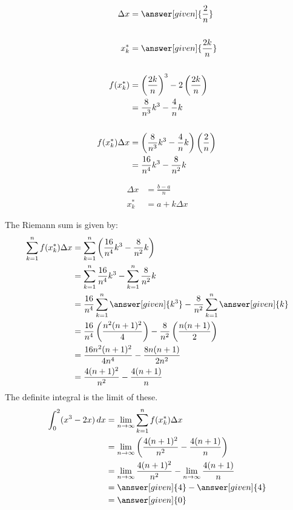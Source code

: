 \documentclass{ximera}
\begin{document}
\begin{example}
\begin{explanation}
		\begin{align*}
			\Delta x &= \answer[given]{\frac{2}{n}} \\ \\
			x_k^* &= \answer[given]{\frac{2k}{n}}\\ \\
			f(x_k^*) &= \left( \frac{2k}{n}\right)^3 - 2\left(\frac{2k}{n}\right)\\
				&= \frac{8}{n^3}k^3 - \frac{4}{n}k \\  \\
			f(x_k^*)\Delta x &= \left(\frac{8}{n^3}k^3 - \frac{4}{n}k\right) \left( \frac{2}{n}\right)\\
				&= \frac{16}{n^4}k^3 - \frac{8}{n^2}k
		\end{align*}				
		\begin{hint}
			\begin{align*}
				\Delta x &= \frac{b-a}{n}\\
				x_k^* &= a + k\Delta x
			\end{align*}
		\end{hint}
		The Riemann sum is given by:
		\begin{align*}
			\sum_{k=1}^n f(x_k^*)\Delta x &= \sum_{k=1}^n \left(\frac{16}{n^4}k^3 - \frac{8}{n^2}k \right)\\
				&= \sum_{k=1}^n \frac{16}{n^4}k^3 - \sum_{k=1}^n \frac{8}{n^2}k \\
				&= \frac{16}{n^4} \sum_{k=1}^n \answer[given]{k^3} - \frac{8}{n^2}\sum_{k=1}^n \answer[given]{k} \\
				&= \frac{16}{n^4} \left( \frac{n^2(n+1)^2}{4} \right) - \frac{8}{n^2}\left( \frac{n(n+1)}{2} \right) \\
				&= \frac{16n^2(n+1)^2}{4n^4} - \frac{8n(n+1)}{2n^2} \\
				&= \frac{4(n+1)^2}{n^2} - \frac{4(n+1)}{n}
		\end{align*}
		The definite integral is the limit of these.
		\begin{align*}
			\int_0^2 (x^3-2x) \d x &= \lim_{n\to \infty}\sum_{k=1}^n f(x_k^*)\Delta x \\
				&= \lim_{n\to\infty} \left(\frac{4(n+1)^2}{n^2} - \frac{4(n+1)}{n}\right) \\
				&= \lim_{n\to\infty} \frac{4(n+1)^2}{n^2} - \lim_{n\to\infty} \frac{4(n+1)}{n} \\
				&= \answer[given]{4} - \answer[given]{4}\\
				&= \answer[given]{0}
		\end{align*}
	\end{explanation}
\end{example}
\end{document}
